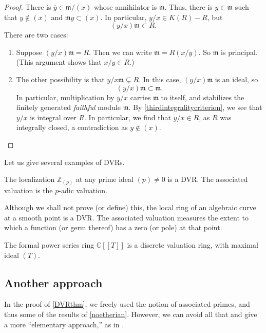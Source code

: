 \begin{proof}
There is $\overline{y} \in \mathfrak{m}/(x)$ whose annihilator is
$\mathfrak{m}$.
Thus, there is $y \in \mathfrak{m}$ such that $y \notin (x)$ and $\mathfrak{m}y
\subset (x)$. In particular, $y/x \in K(R) - R$, but
\[ (y/x) \mathfrak{m} \subset R.  \]
There are two cases:
\begin{enumerate}
\item Suppose $(y/x) \mathfrak{m}  = R$. Then we can write $\mathfrak{m} =
R(x/y)$. So $\mathfrak{m}$ is principal. (This argument shows that $x/y \in R$.)	
\item The other possibility is that $y/x \mathfrak{m} \subsetneq R$. In this
case, $(y/x)\mathfrak{m}$ is an ideal, so 
\[ (y/x) \mathfrak{m} \subset \mathfrak{m}.  \]
In particular, multiplication by $y/x$ carries $\mathfrak{m}$ to itself, and
stabilizes the finitely generated \emph{faithful} module
$\mathfrak{m}$. By \cref{thirdintegralitycriterion}, we see that
$y/x$ is integral over $R$. In particular, we find that $y/x \in R$, as $R$
was integrally closed, a contradiction as $y \notin (x)$. 
\end{enumerate}
\end{proof} 

Let us give several examples of DVRs.
\begin{example} 
The localization $\mathbb{Z}_{(p)}$ at any prime ideal $(p) \neq 0$ is a DVR.
The associated valuation is the $p$-adic valuation.
\end{example} 

\begin{example} 
Although we shall not prove (or define) this, the local ring of an
algebraic curve at a smooth point is a DVR. The associated valuation  measures the
extent to which a function (or germ thereof) has a zero (or pole) at  that
point.
\end{example} 

\begin{example} 
The formal power series ring $\mathbb{C}[[T]]$ is a discrete valuation ring,
with maximal ideal $(T)$. 
\end{example} 

\subsection{Another approach}

In the proof of \cref{DVRthm}, we freely used the notion of associated primes,
and thus some of the results of \cref{noetherian}.
However, we can avoid all that and give a more ``elementary approach,'' as in
\cite{CaFr67}.


